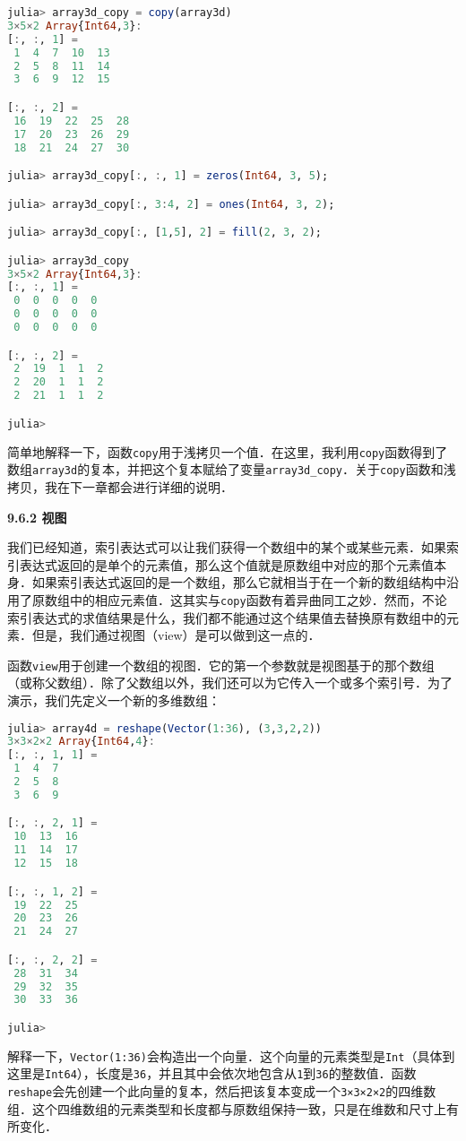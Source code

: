 \begin{lstlisting}[language=julia]
julia> array3d_copy = copy(array3d)
3×5×2 Array{Int64,3}:
[:, :, 1] =
 1  4  7  10  13
 2  5  8  11  14
 3  6  9  12  15

[:, :, 2] =
 16  19  22  25  28
 17  20  23  26  29
 18  21  24  27  30

julia> array3d_copy[:, :, 1] = zeros(Int64, 3, 5);

julia> array3d_copy[:, 3:4, 2] = ones(Int64, 3, 2);

julia> array3d_copy[:, [1,5], 2] = fill(2, 3, 2);

julia> array3d_copy
3×5×2 Array{Int64,3}:
[:, :, 1] =
 0  0  0  0  0
 0  0  0  0  0
 0  0  0  0  0

[:, :, 2] =
 2  19  1  1  2
 2  20  1  1  2
 2  21  1  1  2

julia> 
\end{lstlisting}

简单地解释一下，函数\verb|copy|用于浅拷贝一个值．在这里，我利用\verb|copy|函数得到了数组\verb|array3d|的复本，并把这个复本赋给了变量\verb|array3d_copy|．关于\verb|copy|函数和浅拷贝，我在下一章都会进行详细的说明．

\textbf{9.6.2 视图}

我们已经知道，索引表达式可以让我们获得一个数组中的某个或某些元素．如果索引表达式返回的是单个的元素值，那么这个值就是原数组中对应的那个元素值本身．如果索引表达式返回的是一个数组，那么它就相当于在一个新的数组结构中沿用了原数组中的相应元素值．这其实与\verb|copy|函数有着异曲同工之妙．然而，不论索引表达式的求值结果是什么，我们都不能通过这个结果值去替换原有数组中的元素．但是，我们通过视图（view）是可以做到这一点的．

函数\verb|view|用于创建一个数组的视图．它的第一个参数就是视图基于的那个数组（或称父数组）．除了父数组以外，我们还可以为它传入一个或多个索引号．为了演示，我们先定义一个新的多维数组：

\begin{lstlisting}[language=julia]
julia> array4d = reshape(Vector(1:36), (3,3,2,2))
3×3×2×2 Array{Int64,4}:
[:, :, 1, 1] =
 1  4  7
 2  5  8
 3  6  9

[:, :, 2, 1] =
 10  13  16
 11  14  17
 12  15  18

[:, :, 1, 2] =
 19  22  25
 20  23  26
 21  24  27

[:, :, 2, 2] =
 28  31  34
 29  32  35
 30  33  36

julia> 
\end{lstlisting}

解释一下，\verb|Vector(1:36)|会构造出一个向量．这个向量的元素类型是\verb|Int|（具体到这里是\verb|Int64|），长度是\verb|36|，并且其中会依次地包含从\verb|1|到\verb|36|的整数值．函数\verb|reshape|会先创建一个此向量的复本，然后把该复本变成一个\verb|3×3×2×2|的四维数组．这个四维数组的元素类型和长度都与原数组保持一致，只是在维数和尺寸上有所变化．

